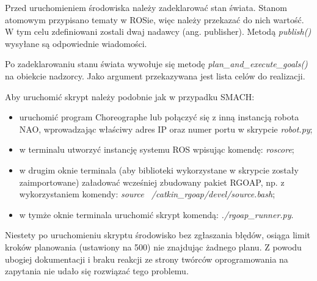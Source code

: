 Przed uruchomieniem środowiska należy zadeklarować stan świata. Stanom atomowym przypisano tematy w ROSie, więc należy przekazać do nich wartość. W tym celu zdefiniowani zostali dwaj nadawcy (ang. publisher). Metodą \textit{publish()} wysyłane są odpowiednie wiadomości.


Po zadeklarowaniu stanu świata wywołuje się metodę \textit{plan\_and\_execute\_goals()} na obiekcie nadzorcy. Jako argument przekazywana jest lista celów do realizacji. 


Aby uruchomić skrypt należy podobnie jak w przypadku SMACH: 
\begin{itemize}
\setlength\itemsep{-0.3em}
\item uruchomić program Choreographe lub połączyć się z inną instancją robota NAO, wprowadzając właściwy adres IP oraz numer portu w skrypcie \textit{robot.py};
\item w terminalu utworzyć instancję systemu ROS wpisując komendę: \textit{roscore};
\item w drugim oknie terminala (aby biblioteki wykorzystane w skrypcie zostały zaimportowane) załadować wcześniej zbudowany pakiet RGOAP, np. z wykorzystaniem komendy: \textit{source ~/catkin\_rgoap/devel/source.bash};
\item w tymże oknie terminala uruchomić skrypt komendą: \textit{./rgoap\_runner.py}.
\end{itemize}

Niestety po uruchomieniu skryptu środowisko bez zgłaszania błędów, osiąga limit kroków planowania (ustawiony na 500) nie znajdując żadnego planu. Z powodu ubogiej dokumentacji i braku reakcji ze strony twórców oprogramowania na zapytania nie udało się rozwiązać tego problemu. 